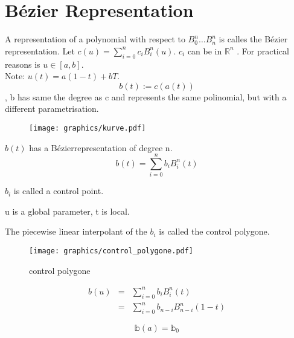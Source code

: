 \section{Bézier Representation}
\begin{defi}
A representation of a polynomial with respect to \( {B_0^n \dots B_n^n}
\) is calles the Bézier representation. Let \( c(u) = \sum_{i=0}^n c_i
B_i^n(u)\). \(c_i\) can be in 
\( \mathbb{R}^n \)
. For practical reasons
is \(u \in [a, b]\).\\
Note: \(u(t)=a(1-t)+bT \).\\
\[ b(t) := c(a(t))\], b has same the degree as c and represents the
same polinomial, but with a different parametrisation.
\end{defi}

\begin{figure}[h]
\centering
\texttt{[image: graphics/kurve.pdf]}
\end{figure}

\(b(t)\) has a Bézierrepresentation of degree n.
\[ b(t) = \sum_{i=0}^n b_iB_i^n(t) \nonumber
\]
\begin{defi} \(b_i\) is called a control point.\end{defi}
\begin{defi} u is a global parameter, t is local.\end{defi}
\begin{defi} The piecewise linear interpolant of the \(b_i\) is called the
  control polygone.

\begin{figure}[h]
\centering
\texttt{[image: graphics/control\_polygone.pdf]}
\caption{control polygone}
\end{figure}
\end{defi}
\begin{lem}

\begin{eqnarray*}
b(u) &=& \sum_{i=0}^n b_i B_i^n(t)\\
     &=& \sum_{i=0}^n b_{n-i}B_{n-i}^n(1-t)
\end{eqnarray*}
\end{lem}
\begin{lem}
\[ \mathbb{b}(a)=\mathbb{b}_0\]
\end{lem}
